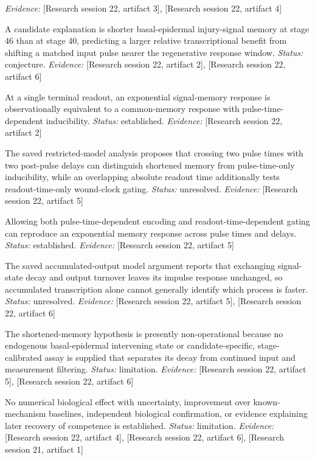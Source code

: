 \documentclass[11pt]{article}
\begin{document}
\begin{sloppypar}
\begin{description}
\textit{Evidence: }[Research session 22, artifact 3], [Research session 22, artifact 4]
\item[C6] A candidate explanation is shorter basal-epidermal injury-signal memory at stage 46 than at stage 40, predicting a larger relative transcriptional benefit from shifting a matched input pulse nearer the regenerative response window. \textit{Status: }conjecture.
\textit{Evidence: }[Research session 22, artifact 2], [Research session 22, artifact 6]
\item[C7] At a single terminal readout, an exponential signal-memory response is observationally equivalent to a common-memory response with pulse-time-dependent inducibility. \textit{Status: }established.
\textit{Evidence: }[Research session 22, artifact 2]
\item[C8] The saved restricted-model analysis proposes that crossing two pulse times with two post-pulse delays can distinguish shortened memory from pulse-time-only inducibility, while an overlapping absolute readout time additionally tests readout-time-only wound-clock gating. \textit{Status: }unresolved.
\textit{Evidence: }[Research session 22, artifact 5]
\item[C9] Allowing both pulse-time-dependent encoding and readout-time-dependent gating can reproduce an exponential memory response across pulse times and delays. \textit{Status: }established.
\textit{Evidence: }[Research session 22, artifact 5]
\item[C10] The saved accumulated-output model argument reports that exchanging signal-state decay and output turnover leaves its impulse response unchanged, so accumulated transcription alone cannot generally identify which process is faster. \textit{Status: }unresolved.
\textit{Evidence: }[Research session 22, artifact 5], [Research session 22, artifact 6]
\item[C11] The shortened-memory hypothesis is presently non-operational because no endogenous basal-epidermal intervening state or candidate-specific, stage-calibrated assay is supplied that separates its decay from continued input and measurement filtering. \textit{Status: }limitation.
\textit{Evidence: }[Research session 22, artifact 5], [Research session 22, artifact 6]
\item[C12] No numerical biological effect with uncertainty, improvement over known-mechanism baselines, independent biological confirmation, or evidence explaining later recovery of competence is established. \textit{Status: }limitation.
\textit{Evidence: }[Research session 22, artifact 4], [Research session 22, artifact 6], [Research session 21, artifact 1]

\end{description}
\end{sloppypar}
\end{document}
